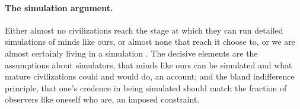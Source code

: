 \paragraph{The simulation argument.} Either almost no civilizations reach the stage at which they can
run detailed simulations of minds like ours, or almost none that reach it choose to, or we are almost
certainly living in a simulation \citep{bostrom2003}. The decisive elements are the assumptions
about simulators, that minds like ours can be simulated and what mature civilizations could and
would do, an account; and the bland indifference principle, that one's credence in being simulated
should match the fraction of observers like oneself who are, an imposed constraint.
